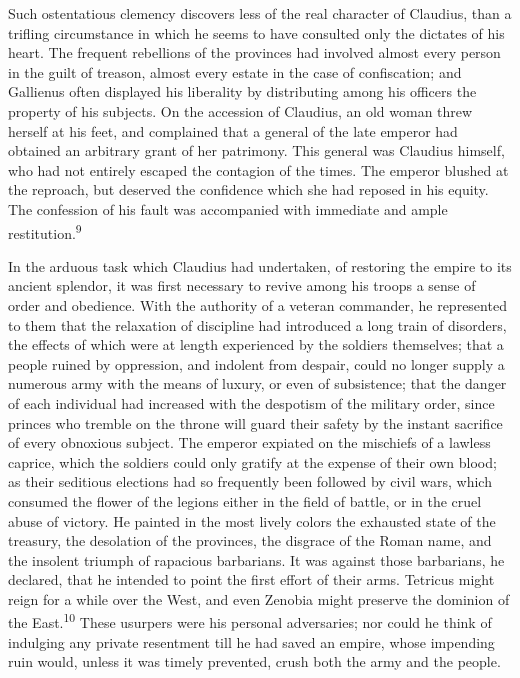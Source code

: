 Such ostentatious clemency discovers less of the real character
of Claudius, than a trifling circumstance in which he seems to
have consulted only the dictates of his heart. The frequent
rebellions of the provinces had involved almost every person in
the guilt of treason, almost every estate in the case of
confiscation; and Gallienus often displayed his liberality by
distributing among his officers the property of his subjects. On
the accession of Claudius, an old woman threw herself at his
feet, and complained that a general of the late emperor had
obtained an arbitrary grant of her patrimony. This general was
Claudius himself, who had not entirely escaped the contagion of
the times. The emperor blushed at the reproach, but deserved the
confidence which she had reposed in his equity. The confession of
his fault was accompanied with immediate and ample restitution.\textsuperscript{9}


In the arduous task which Claudius had undertaken, of restoring
the empire to its ancient splendor, it was first necessary to
revive among his troops a sense of order and obedience. With the
authority of a veteran commander, he represented to them that the
relaxation of discipline had introduced a long train of
disorders, the effects of which were at length experienced by the
soldiers themselves; that a people ruined by oppression, and
indolent from despair, could no longer supply a numerous army
with the means of luxury, or even of subsistence; that the danger
of each individual had increased with the despotism of the
military order, since princes who tremble on the throne will
guard their safety by the instant sacrifice of every obnoxious
subject. The emperor expiated on the mischiefs of a lawless
caprice, which the soldiers could only gratify at the expense of
their own blood; as their seditious elections had so frequently
been followed by civil wars, which consumed the flower of the
legions either in the field of battle, or in the cruel abuse of
victory. He painted in the most lively colors the exhausted state
of the treasury, the desolation of the provinces, the disgrace of
the Roman name, and the insolent triumph of rapacious barbarians.
It was against those barbarians, he declared, that he intended to
point the first effort of their arms. Tetricus might reign for a
while over the West, and even Zenobia might preserve the dominion
of the East.\textsuperscript{10} These usurpers were his personal adversaries; nor
could he think of indulging any private resentment till he had
saved an empire, whose impending ruin would, unless it was timely
prevented, crush both the army and the people.

